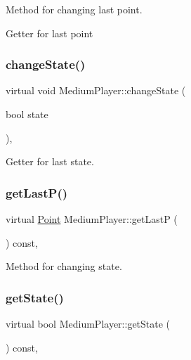 Method for changing last point. 

Getter for last point \mbox{\label{class_medium_player_ae0f69d678d6567e09baed0350468be61}} 
\subsubsection{\texorpdfstring{change\+State()}{changeState()}}
{\footnotesize\ttfamily virtual void Medium\+Player\+::change\+State (\begin{DoxyParamCaption}\item[{bool}]{state }\end{DoxyParamCaption})\hspace{0.3cm}{\ttfamily [inline]}, {\ttfamily [virtual]}}



Getter for last state. 

\mbox{\label{class_medium_player_abd585986250a5b713d6a554ea70e3ba6}} 
\subsubsection{\texorpdfstring{get\+Last\+P()}{getLastP()}}
{\footnotesize\ttfamily virtual \mbox{\hyperlink{class_point}{Point}} Medium\+Player\+::get\+LastP (\begin{DoxyParamCaption}{ }\end{DoxyParamCaption}) const\hspace{0.3cm}{\ttfamily [inline]}, {\ttfamily [virtual]}}



Method for changing state. 

\mbox{\label{class_medium_player_a90a8cd5feeaa759043af77afe266907c}} 
\subsubsection{\texorpdfstring{get\+State()}{getState()}}
{\footnotesize\ttfamily virtual bool Medium\+Player\+::get\+State (\begin{DoxyParamCaption}{ }\end{DoxyParamCaption}) const\hspace{0.3cm}{\ttfamily [inline]}, {\ttfamily [virtual]}}

